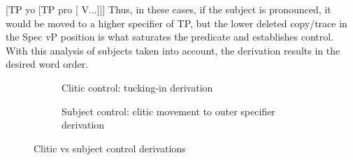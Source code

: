 \documentclass[output=paper,colorlinks,citecolor=brown]{langscibook}
\begin{document}
{\ea \label{suner} [TP yo [TP pro [ V...]]]
\z
Thus, in these cases, if the subject is pronounced, it would be moved to a higher specifier of TP, but the lower deleted copy/trace in the Spec vP position is what saturates the predicate and establishes control. With this analysis of subjects taken into account, the derivation results in the desired word order.}


\begin{figure}
\begin{subfigure}{\textwidth}

\caption{Clitic control: tucking-in derivation}
\label{ccCtree}
\end{subfigure}
\begin{subfigure}{\textwidth}

\caption{Subject control: clitic movement to outer specifier derivation}
\label{ccStree}
\end{subfigure}
\caption{Clitic vs subject control derivations}
\label{treederiv}
\end{figure}
\end{document}
